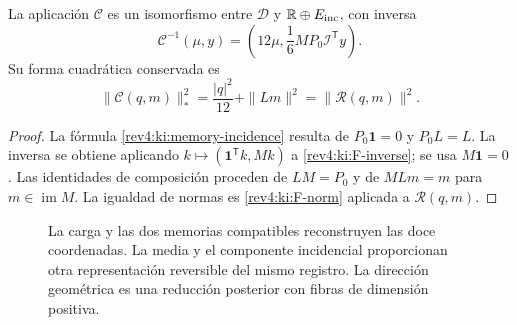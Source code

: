 \begin{corollary}
\label{rev4:ki:composition}
La aplicación \(\mathcal C\) es un isomorfismo entre
\(\mathcal D\) y \(\mathbb R\oplus E_{\rm inc}\), con inversa
\begin{equation}
 \mathcal C^{-1}(\mu,y)=
 \left(12\mu,\frac16MP_0\mathcal I^{\mathsf T}y\right).
 \label{rev4:ki:C-inverse}
\end{equation}
Su forma cuadrática conservada es
\[
 \|\mathcal C(q,m)\|_*^2=
 \frac{|q|^2}{12}+\|Lm\|^2=\|\mathcal R(q,m)\|^2.
\]
\end{corollary}
\begin{proof}
La fórmula \eqref{rev4:ki:memory-incidence} resulta de
\(P_0\mathbf1=0\) y \(P_0L=L\). La inversa se obtiene
aplicando \(k\mapsto(\mathbf1^{\mathsf T}k,Mk)\) a
\eqref{rev4:ki:F-inverse}; se usa \(M\mathbf1=0\).
Las identidades de composición proceden de \(LM=P_0\) y de
\(MLm=m\) para \(m\in\operatorname{im}M\). La igualdad de
normas es \eqref{rev4:ki:F-norm} aplicada a \(\mathcal R(q,m)\).
\end{proof}

\begin{figure}[htbp]
\centering
{}
\caption{La carga y las dos memorias compatibles reconstruyen las doce
coordenadas. La media y el componente incidencial proporcionan otra
representación reversible del mismo registro. La dirección geométrica
es una reducción posterior con fibras de dimensión positiva.}
\label{rev4:ki:figure}
\end{figure}

